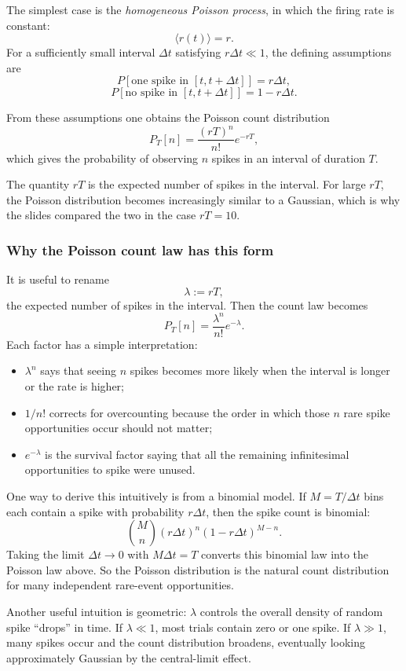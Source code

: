 \documentclass[11pt]{article}
\begin{document}
The simplest case is the \emph{homogeneous Poisson process}, in which the firing rate is constant:
\[
\langle r(t)\rangle = r.
\]
For a sufficiently small interval $\Delta t$ satisfying $r\Delta t \ll 1$, the defining assumptions are
\[
P[\text{one spike in } [t,t+\Delta t]] = r\Delta t,
\]
\[
P[\text{no spike in } [t,t+\Delta t]] = 1-r\Delta t.
\]

From these assumptions one obtains the Poisson count distribution
\[
P_T[n] = \frac{(rT)^n}{n!}e^{-rT},
\]
which gives the probability of observing $n$ spikes in an interval of duration $T$.

The quantity $rT$ is the expected number of spikes in the interval. For large $rT$, the Poisson distribution becomes increasingly similar to a Gaussian, which is why the slides compared the two in the case $rT=10$.

\subsubsection{Why the Poisson count law has this form}

It is useful to rename
\[
\lambda := rT,
\]
the expected number of spikes in the interval. Then the count law becomes
\[
P_T[n] = \frac{\lambda^n}{n!}e^{-\lambda}.
\]
Each factor has a simple interpretation:
\begin{itemize}
    \item $\lambda^n$ says that seeing $n$ spikes becomes more likely when the interval is longer or the rate is higher;
    \item $1/n!$ corrects for overcounting because the order in which those $n$ rare spike opportunities occur should not matter;
    \item $e^{-\lambda}$ is the survival factor saying that all the remaining infinitesimal opportunities to spike were unused.
\end{itemize}

One way to derive this intuitively is from a binomial model. If $M=T/\Delta t$ bins each contain a spike with probability $r\Delta t$, then the spike count is binomial:
\[
\binom{M}{n}(r\Delta t)^n(1-r\Delta t)^{M-n}.
\]
Taking the limit $\Delta t\to 0$ with $M\Delta t=T$ converts this binomial law into the Poisson law above. So the Poisson distribution is the natural count distribution for many independent rare-event opportunities.

Another useful intuition is geometric: $\lambda$ controls the overall density of random spike ``drops'' in time. If $\lambda\ll 1$, most trials contain zero or one spike. If $\lambda\gg 1$, many spikes occur and the count distribution broadens, eventually looking approximately Gaussian by the central-limit effect.
\end{document}
